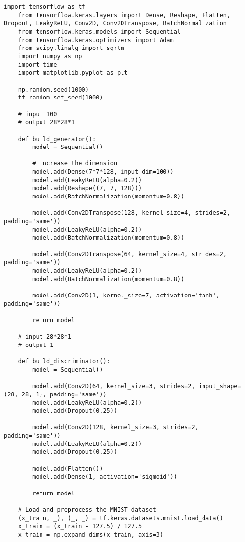 \begin{lstlisting}[style=mypython, caption=GAN model with Convolutional layers]
    import tensorflow as tf
    from tensorflow.keras.layers import Dense, Reshape, Flatten, Dropout, LeakyReLU, Conv2D, Conv2DTranspose, BatchNormalization
    from tensorflow.keras.models import Sequential
    from tensorflow.keras.optimizers import Adam
    from scipy.linalg import sqrtm
    import numpy as np
    import time
    import matplotlib.pyplot as plt
    
    np.random.seed(1000)
    tf.random.set_seed(1000)
    
    # input 100
    # output 28*28*1
    
    def build_generator():
        model = Sequential()
        
        # increase the dimension
        model.add(Dense(7*7*128, input_dim=100))
        model.add(LeakyReLU(alpha=0.2))
        model.add(Reshape((7, 7, 128)))
        model.add(BatchNormalization(momentum=0.8))
    
        model.add(Conv2DTranspose(128, kernel_size=4, strides=2, padding='same'))
        model.add(LeakyReLU(alpha=0.2))
        model.add(BatchNormalization(momentum=0.8))
    
        model.add(Conv2DTranspose(64, kernel_size=4, strides=2, padding='same'))
        model.add(LeakyReLU(alpha=0.2))
        model.add(BatchNormalization(momentum=0.8))
    
        model.add(Conv2D(1, kernel_size=7, activation='tanh', padding='same'))
    
        return model
    
    # input 28*28*1
    # output 1
    
    def build_discriminator():
        model = Sequential()
        
        model.add(Conv2D(64, kernel_size=3, strides=2, input_shape=(28, 28, 1), padding='same'))
        model.add(LeakyReLU(alpha=0.2))
        model.add(Dropout(0.25))
    
        model.add(Conv2D(128, kernel_size=3, strides=2, padding='same'))
        model.add(LeakyReLU(alpha=0.2))
        model.add(Dropout(0.25))
    
        model.add(Flatten())
        model.add(Dense(1, activation='sigmoid'))
    
        return model
    
    # Load and preprocess the MNIST dataset
    (x_train, _), (_, _) = tf.keras.datasets.mnist.load_data()
    x_train = (x_train - 127.5) / 127.5
    x_train = np.expand_dims(x_train, axis=3)
    

\end{lstlisting}
